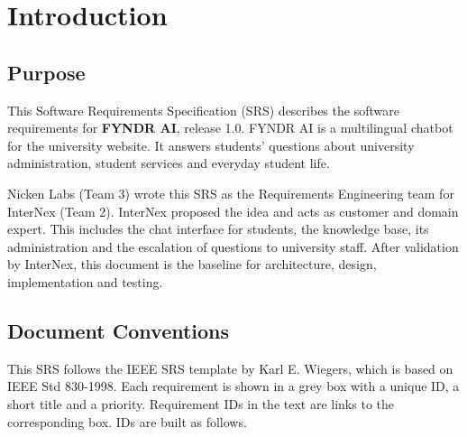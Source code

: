 \documentclass[11pt, a4paper]{article}
\begin{document}
\newpage

\setcounter{page}{1}

\section{Introduction}

\subsection{Purpose}
This Software Requirements Specification (SRS) describes the software requirements for \textbf{FYNDR AI}, release 1.0. FYNDR AI is a multilingual chatbot for the university website. It answers students' questions about university administration, student services and everyday student life.

Nicken Labs (Team 3) wrote this SRS as the Requirements Engineering team for InterNex (Team 2). InterNex proposed the idea and acts as customer and domain expert. This includes the chat interface for students, the knowledge base, its administration and the escalation of questions to university staff. After validation by InterNex, this document is the baseline for architecture, design, implementation and testing.

\subsection{Document Conventions}
This SRS follows the IEEE SRS template by Karl E. Wiegers, which is based on IEEE Std 830-1998. Each requirement is shown in a grey box with a unique ID, a short title and a priority. Requirement IDs in the text are links to the corresponding box. IDs are built as follows.
\end{document}
